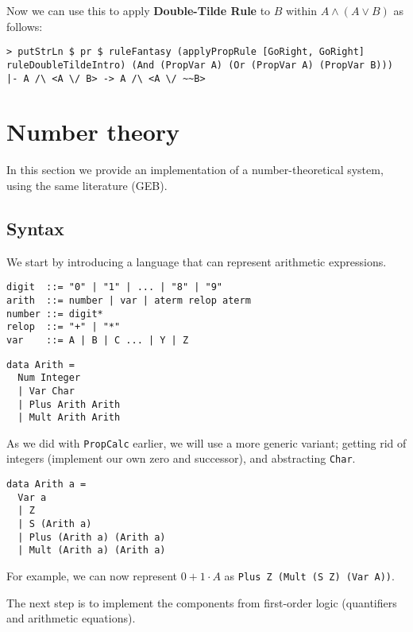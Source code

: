 \documentclass{article}
\begin{document}
Now we can use this to apply \textbf{Double-Tilde Rule} to $B$ within $A \land (A \lor B)$ as follows:

\begin{lstlisting}
> putStrLn $ pr $ ruleFantasy (applyPropRule [GoRight, GoRight] ruleDoubleTildeIntro) (And (PropVar A) (Or (PropVar A) (PropVar B)))
|- A /\ <A \/ B> -> A /\ <A \/ ~~B>
\end{lstlisting}

\section{Number theory}

In this section we provide an implementation of a number-theoretical system, using the same literature (GEB).

\subsection{Syntax}

We start by introducing a language that can represent arithmetic expressions.

\begin{minipage}{0.49\textwidth}
\begin{lstlisting}
digit  ::= "0" | "1" | ... | "8" | "9"
arith  ::= number | var | aterm relop aterm
number ::= digit*
relop  ::= "+" | "*"
var    ::= A | B | C ... | Y | Z
\end{lstlisting}
\end{minipage}
\begin{minipage}{0.49\textwidth}
\begin{lstlisting}
data Arith =
  Num Integer
  | Var Char
  | Plus Arith Arith
  | Mult Arith Arith
\end{lstlisting}
\end{minipage}

As we did with \texttt{PropCalc} earlier, we will use a more generic variant; getting rid of integers (implement our own zero and successor), and abstracting \texttt{Char}.

\begin{lstlisting}
data Arith a =
  Var a
  | Z
  | S (Arith a)
  | Plus (Arith a) (Arith a)
  | Mult (Arith a) (Arith a)
\end{lstlisting}

For example, we can now represent $0 + 1 \cdot A$ as \texttt{Plus Z (Mult (S Z) (Var A))}.

The next step is to implement the components from first-order logic (quantifiers and arithmetic equations).
\end{document}
